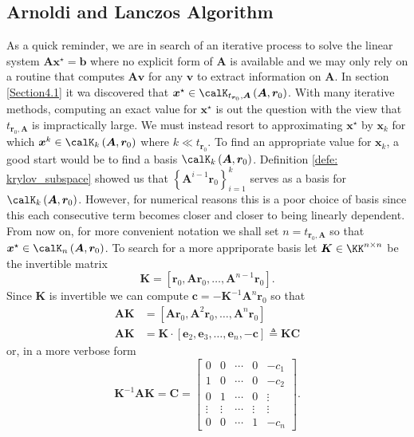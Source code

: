 \subsection{Arnoldi and Lanczos Algorithm}\label{Section4.3}

As a quick reminder, we are in search of an iterative process to solve the linear system $\bm{A} \bm{x}^{\star} = \bm{b}$ where no explicit form of $\bm{A}$ is available and we may only rely on a routine that computes $\bm{A} \bm{v}$ for any $\bm{v}$ to extract information on $\bm{A}$. In section \ref{Section4.1} it wa discovered that $\bm{x}^{\star} \in \calK_{t_{\bm{r}_0}, \bm{A}} \left( \bm{A}, \bm{r}_0 \right)$. With many iterative methods, computing an exact value for $\bm{x}^{\star}$ is out the question with the view that $t_{\bm{r}_0, \bm{A}}$ is impractically large. We must instead resort to approximating $\bm{x}^{\star}$ by $\bm{x}_k$ for which $\bm{x}^{k} \in \calK_{k} \left( \bm{A}, \bm{r}_0 \right)$ where $k \ll t_{\bm{r}_0}$. To find an appropriate value for $\bm{x}_k$, a good start would be to find a basis $\calK_{k} \left( \bm{A}, \bm{r}_0 \right)$. Definition \ref{defe: krylov_subspace} showed us that $\left\{ \bm{A}^{i-1} \bm{r}_0 \right\}_{i=1}^{k}$ serves as a basis for $\calK_{k} \left( \bm{A}, \bm{r}_0 \right)$. However, for numerical reasons this is a poor choice of basis since this each consecutive term becomes closer and closer to being linearly dependent. From now on, for more convenient notation we shall set $n = t_{\bm{r}_0, \bm{A}}$ so that $\bm{x}^{\star} \in \calK_{n} \left( \bm{A}, \bm{r}_0 \right)$. To search for a more appriporate basis let $\bm{K} \in \KK^{n \times n}$ be the invertible matrix
\[
    \bm{K} = \left[ \bm{r}_0 , \bm{A} \bm{r}_0, \ldots , \bm{A}^{n-1} \bm{r}_0 \right].
\]
Since $\bm{K}$ is invertible we can compute $\bm{c} = - \bm{K}^{-1} \bm{A}^{n} \bm{r}_0$ so that
\begin{align*}
    \bm{A} \bm{K} & = \left[ \bm{A} \bm{r}_0, \bm{A}^{2} \bm{r}_0, \ldots , \bm{A}^{n} \bm{r}_0 \right]                     \\
    \bm{A} \bm{K} & = \bm{K} \cdot \left[ \bm{e}_2, \bm{e}_3, \ldots , \bm{e}_n, - \bm{c}  \right] \triangleq \bm{K} \bm{C}
\end{align*}
or, in a more verbose form
\[
    \bm{K}^{-1} \bm{A} \bm{K} = \bm{C} =
    \begin{bmatrix}
        0      & 0      & \cdots & 0      & -c_1   \\
        1      & 0      & \cdots & 0      & -c_2   \\
        0      & 1      & \cdots & 0      & \vdots \\
        \vdots & \vdots & \cdots & \vdots & \vdots \\
        0      & 0      & \cdots & 1      & -c_n
    \end{bmatrix}.
\]
